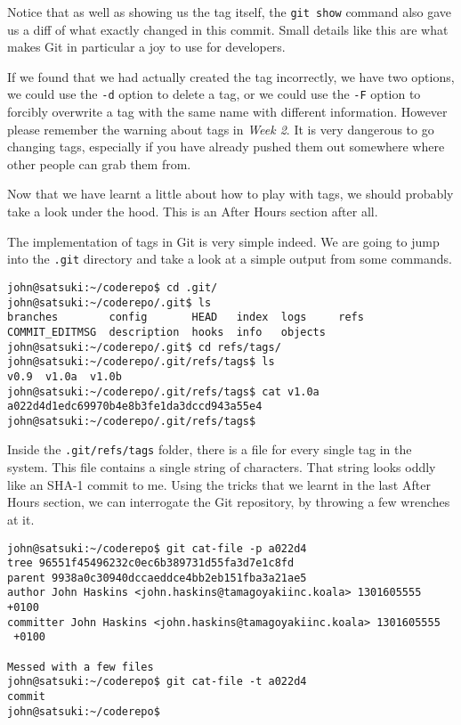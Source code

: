 Notice that as well as showing us the tag itself, the \texttt{git show} command also gave us a diff of what exactly changed in this commit.
Small details like this are what makes Git in particular a joy to use for developers.

If we found that we had actually created the tag incorrectly, we have two options, we could use the \texttt{-d} option to delete a tag, or we could use the \texttt{-F} option to forcibly overwrite a tag with the same name with different information.
However please remember the warning about tags in \emph{Week 2}.
It is very dangerous to go changing tags, especially if you have already pushed them out somewhere where other people can grab them from.

Now that we have learnt a little about how to play with tags, we should probably take a look under the hood.
This is an After Hours section after all.

The implementation of tags in Git is very simple indeed.
We are going to jump into the \texttt{.git} directory and take a look at a simple output from some commands.

\begin{Verbatim}
john@satsuki:~/coderepo$ cd .git/
john@satsuki:~/coderepo/.git$ ls
branches        config       HEAD   index  logs     refs
COMMIT_EDITMSG  description  hooks  info   objects
john@satsuki:~/coderepo/.git$ cd refs/tags/
john@satsuki:~/coderepo/.git/refs/tags$ ls
v0.9  v1.0a  v1.0b
john@satsuki:~/coderepo/.git/refs/tags$ cat v1.0a
a022d4d1edc69970b4e8b3fe1da3dccd943a55e4
john@satsuki:~/coderepo/.git/refs/tags$
\end{Verbatim}

Inside the \texttt{.git/refs/tags} folder, there is a file for every single tag in the system.
This file contains a single string of characters.
That string looks oddly like an SHA-1 commit to me.
Using the tricks that we learnt in the last After Hours section, we can interrogate the Git repository, by throwing a few wrenches at it.

\begin{Verbatim}
john@satsuki:~/coderepo$ git cat-file -p a022d4
tree 96551f45496232c0ec6b389731d55fa3d7e1c8fd
parent 9938a0c30940dccaeddce4bb2eb151fba3a21ae5
author John Haskins <john.haskins@tamagoyakiinc.koala> 1301605555 +0100
committer John Haskins <john.haskins@tamagoyakiinc.koala> 1301605555
 +0100

Messed with a few files
john@satsuki:~/coderepo$ git cat-file -t a022d4
commit
john@satsuki:~/coderepo$
\end{Verbatim}

